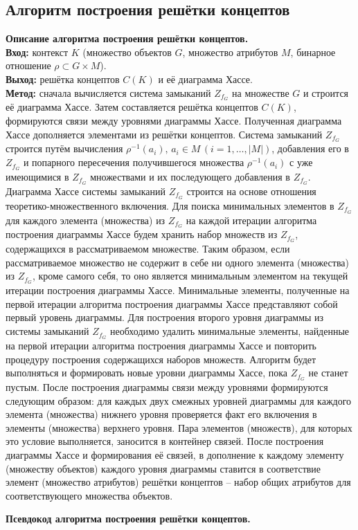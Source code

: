 \documentclass[spec, och, otchet, hidelinks]{SCWorks}
\begin{document}
\subsection{Алгоритм построения решётки концептов}
\par \textbf{Описание алгоритма построения решётки концептов.} \\
\textbf{Вход:} контекст $K$ (множество объектов $G$, множество атрибутов $M$,
бинарное отношение $\rho \subset G \times M$). \\
\textbf{Выход:} решётка концептов $C(K)$ и её диаграмма Хассе. \\
\textbf{Метод:} сначала вычисляется система замыканий $Z_{f_G}$ на множестве
$G$ и строится её диаграмма Хассе. Затем составляется решётка концептов $C(K)$,
формируются связи между уровнями диаграммы Хассе. Полученная диаграмма Хассе
дополняется элементами из решётки концептов. Система замыканий $Z_{f_G}$ строится путём
вычисления $\rho^{-1}(a_i), \, a_i \in M \, (i = 1,\dots,|M|)$, добавления его в
$Z_{f_G}$ и попарного пересечения получившегося множества $\rho^{-1} (a_i)$ с
уже имеющимися в
$Z_{f_G}$ множествами и их последующего добавления в $Z_{f_G}$. Диаграмма Хассе
системы замыканий $Z_{f_G}$ строится на основе отношения
теоретико-множественного включения. Для поиска минимальных элементов в $Z_{f_G}$
для каждого элемента (множества) из $Z_{f_G}$ на каждой итерации алгоритма
построения диаграммы Хассе будем хранить набор множеств из $Z_{f_G}$,
содержащихся в рассматриваемом множестве. Таким образом, если рассматриваемое
множество не содержит в себе ни одного элемента (множества) из $Z_{f_G}$, кроме
самого себя, то оно является минимальным элементом на текущей итерации
построения диаграммы Хассе. Минимальные элементы, полученные на первой итерации
алгоритма построения диаграммы Хассе представляют собой первый уровень
диаграммы. Для построения второго уровня диаграммы из системы замыканий $Z_{f_G}$
необходимо удалить минимальные элементы, найденные на первой итерации алгоритма
построения диаграммы Хассе и повторить процедуру построения содержащихся наборов
множеств. Алгоритм будет выполняться и формировать новые уровни диаграммы Хассе,
пока $Z_{f_G}$ не станет пустым. После построения диаграммы связи между уровнями
формируются следующим образом: для каждых двух смежных уровней диаграммы для
каждого элемента (множества) нижнего уровня проверяется факт его включения в
элементы (множества) верхнего уровня. Пара
элементов (множеств), для которых это условие выполняется, заносится в контейнер
связей. После построения диаграммы Хассе и формирования её связей, в дополнение
к каждому элементу (множеству объектов) каждого уровня диаграммы ставится в
соответствие элемент (множество атрибутов) решётки концептов -- набор общих
атрибутов для соответствующего множества объектов.
\\
\par \textbf{Псевдокод алгоритма построения решётки концептов.}
\end{document}
